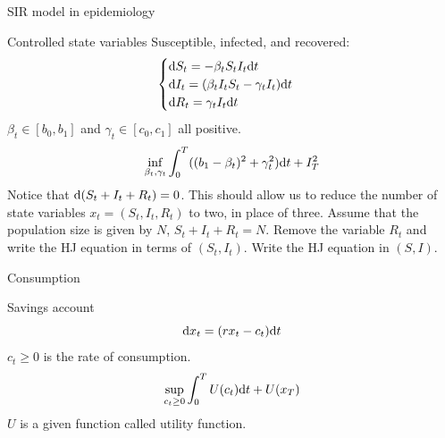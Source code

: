 \documentclass[color=usenames,dvipsnames]{beamer}
\newcommand{\dd}{\text{\normalfont d}}
\newcommand{\dt}{\text{\normalfont d}t}
\begin{document}
\begin{frame}{SIR model in epidemiology}
    \begin{block}
        {Controlled state variables}
        Susceptible, infected, and recovered:
        \[
        \begin{cases}
            \dd{S}_t=-\beta_t S_t I_t \dt\\
            \dd{I}_t = (\beta_t I_t S_t - \gamma_t I_t)\dt\\
            \dd{R}_t= \gamma_t I_t \dt
        \end{cases}
        \]
        $\beta_t\in[b_0,b_1]$ and $\gamma_t\in[c_0,c_1]$ all positive.
    \[
    \inf_{\beta_t,\gamma_t}\int_0^T ((b_1-\beta_t)^2+\gamma_t^2)\dt + I^2_T
    \]
    Notice that $\dd(S_t+I_t+R_t)=0$. This should allow us to reduce the number of state variables $x_t=(S_t,I_t,R_t)$ to two, in place of three. Assume that the population size is given by $N$, $S_t+I_t+R_t=N$. Remove the variable $R_t$ and write the HJ equation in terms of $(S_t,I_t)$.
    Write the HJ equation in $(S,I)$.
    \end{block}
\end{frame}


\begin{frame}{Consumption}
    \begin{block}
        {Savings account}
        \[
        \dd{x}_t = (rx_t - c_t)\dt
        \]
        $c_t\ge0$ is the rate of consumption.
        \[
        \sup_{c_t\ge0} \int_0^T U(c_t)\dt + U(x_T)
        \]
        $U$ is a given function called {\color{blue}utility function}.
    \end{block}
\end{frame}

\end{document}

